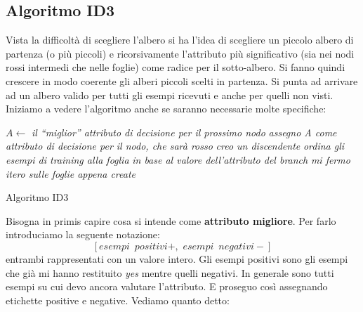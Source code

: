 \documentclass[a4paper,12pt, oneside]{book}
\begin{document}
\subsection{Algoritmo ID3}
Vista la difficoltà di scegliere l'albero si ha l'idea di scegliere un piccolo
albero di partenza (o più piccoli) e ricorsivamente l'attributo più
significativo (sia nei nodi rossi intermedi che nelle foglie) come radice per il
sotto-albero. Si fanno quindi crescere in modo 
coerente gli alberi piccoli scelti in partenza. Si punta ad arrivare ad un
albero valido per tutti gli esempi ricevuti e anche per quelli non visti.
\newpage
Iniziamo a vedere l'algoritmo anche se saranno necessarie molte specifiche:
\begin{algorithm}[H]
  \begin{algorithmic}
    \State $A \gets$ \textit{il ``miglior'' attributo di decisione per il
    prossimo nodo}
    \State \textit{assegno A come attributo di decisione per il nodo, che sarà
    rosso}
    \State \textit{creo un discendente}
    \EndFor
    \State \textit{ordina gli esempi di training alla foglia}
    \State \textit{in base al valore dell'attributo del branch}
    \State \textit{mi fermo}
    \Else
    \State \textit{itero sulle foglie appena create}
    \EndFunction
  \end{algorithmic}
  \caption{Algoritmo ID3}
\end{algorithm}
Bisogna in primis capire cosa si intende come \textbf{attributo migliore}. Per
farlo introduciamo la seguente notazione:
\[[esempi\,\,\,positivi+,\,\,esempi\,\,\,negativi-]\]
entrambi rappresentati con un valore intero. Gli esempi positivi sono gli esempi
che già mi hanno restituito \textit{yes} mentre quelli negativi. In generale
sono tutti esempi su cui devo ancora valutare l'attributo. E proseguo così
assegnando etichette positive e negative.
Vediamo quanto detto:

\begin{figure}[H]
  \centering
\end{figure}
\end{document}
